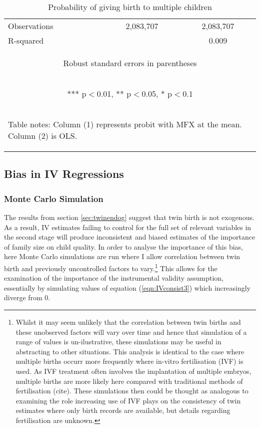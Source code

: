 \documentclass{article}[11pt,subeqn]
\begin{document}
\begin{spacing}{1.25}
\begin{table}[ht]
\begin{center}
\begin{tabular}{lcc}
  Observations & 2,083,707 & 2,083,707 \\
  R-squared &  & 0.009  \\ \midrule
\multicolumn{3}{c}{\begin{footnotesize}Robust standard errors in parentheses\end{footnotesize}} \\
\multicolumn{3}{c}{\begin{footnotesize}*** p$<$0.01, ** p$<$0.05, * p$<$0.1\end{footnotesize}} \\ 
\multicolumn{3}{p{7.2cm}}{\begin{footnotesize}Table notes: Column (1) represents probit with MFX at the mean.  Column
(2) is OLS.\end{footnotesize}}\\
\bottomrule
\end{tabular}
\end{center}
\label{tab:twinreg1}
\caption{Probability of giving birth to multiple children}
\end{table}
\subsection{Bias in IV Regressions}
\subsubsection{Monte Carlo Simulation}
The results from section \ref{sec:twinendog} suggest that twin birth is not exogenous. As a result, IV estimates failing to control for the full set of 
relevant variables in the second stage will produce inconsistent and biased estimates of the importance of family size on child quality.  In order to analyse 
the importance of this bias, here Monte Carlo simulations are run where I allow correlation between twin birth and previously uncontrolled factors
to vary.\footnote{Whilst it may seem unlikely that the correlation between twin births and these unobserved factors will vary over time and hence that
simulation of a range of values is un-ilustrative, these simulations may be useful in abstracting to other situations.  This analysis is identical to the
case where multiple births occurr more frequently where in-vitro fertilisation (IVF) is used.  As IVF treatment often involves the implantation of 
multiple embryos, multiple births are more likely here compared with traditional methods of fertilisation (cite).  These simulations then could be 
thought as analogous to examining the role increasing use of IVF plays on the consistency of twin estimates where only birth records are available, 
but details regarding fertilisation are unknown.}  This allows for the examination of the importance of the instrumental validity assumption, essentially
by simulating values of equation (\ref{eqn:IVconsist3}) which increasingly diverge from 0. 

\end{spacing}
\end{document}
